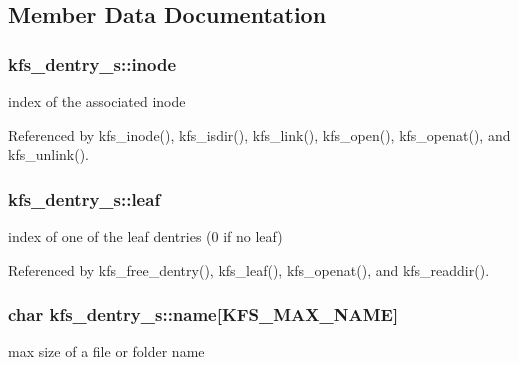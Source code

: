 \subsection{Member Data Documentation}
\hypertarget{structkfs__dentry__s_a4e87e5375dfccc972eae6a05bfa2a086}{
\subsubsection[{inode}]{ kfs\-\_\-dentry\-\_\-s\-::inode}}\label{structkfs__dentry__s_a4e87e5375dfccc972eae6a05bfa2a086}


index of the associated inode 



Referenced by kfs\-\_\-inode(), kfs\-\_\-isdir(), kfs\-\_\-link(), kfs\-\_\-open(), kfs\-\_\-openat(), and kfs\-\_\-unlink().

\hypertarget{structkfs__dentry__s_a79fd3c8764d633fdb895b77856f61d61}{
\subsubsection[{leaf}]{ kfs\-\_\-dentry\-\_\-s\-::leaf}}\label{structkfs__dentry__s_a79fd3c8764d633fdb895b77856f61d61}


index of one of the leaf dentries (0 if no leaf) 



Referenced by kfs\-\_\-free\-\_\-dentry(), kfs\-\_\-leaf(), kfs\-\_\-openat(), and kfs\-\_\-readdir().

\hypertarget{structkfs__dentry__s_a9e5a536f0b9b95dc094c58c66c61ddcc}{
\subsubsection[{name}]{\setlength{\rightskip}{0pt plus 5cm}char kfs\-\_\-dentry\-\_\-s\-::name\mbox{[}{\bf K\-F\-S\-\_\-\-M\-A\-X\-\_\-\-N\-A\-M\-E}\mbox{]}}}\label{structkfs__dentry__s_a9e5a536f0b9b95dc094c58c66c61ddcc}


max size of a file or folder name 



